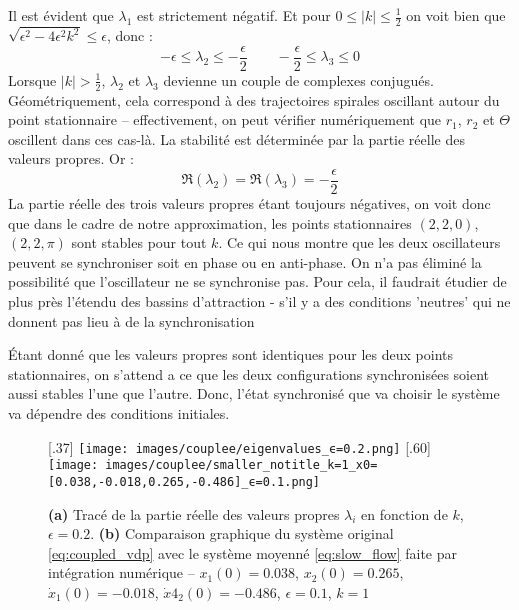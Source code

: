 %
Il est évident que $\lambda_1$ est strictement négatif. %
Et pour $0 \leq |k| \leq \frac{1}{2} $ on voit bien que $\sqrt{\epsilon^2 - 4\epsilon^2k^2} \leq \epsilon$, donc :
\[ -\epsilon \leq \lambda_2 \leq -\frac{\epsilon}{2} \qquad -\frac{\epsilon}{2} \leq \lambda_3 \leq 0\]
%
Lorsque $|k| > \frac{1}{2}$, $\lambda_2$ et $\lambda_3$ devienne un couple de complexes conjugués. Géométriquement, cela correspond à des trajectoires spirales oscillant autour du point stationnaire – effectivement, on peut vérifier numériquement que $r_1$, $r_2$ et $\Theta$ oscillent dans ces cas-là. La stabilité est déterminée par la partie réelle des valeurs propres. Or :
\[ \Re(\lambda_2) = \Re(\lambda_3) = -\frac{\epsilon}{2} \]
%
La partie réelle des trois valeurs propres étant toujours négatives, 
on voit donc que dans le cadre de notre approximation, les points stationnaires $(2, 2, 0)$, $(2, 2, \pi)$ sont stables pour tout $k$. 
Ce qui nous montre que les deux oscillateurs peuvent se synchroniser soit en phase ou en anti-phase. 
On n'a pas éliminé la possibilité que l'oscillateur ne se synchronise pas. 
Pour cela, il faudrait étudier de plus près l'étendu des bassins d'attraction - s'il y a des conditions 'neutres' 
qui ne donnent pas lieu à de la synchronisation

Étant donné que les valeurs propres sont identiques pour les deux points stationnaires, 
on s'attend a ce que les deux configurations synchronisées soient aussi stables l'une que l'autre. 
Donc, l'état synchronisé que va choisir le système va dépendre des conditions initiales.

\begin{figure}
    \centering
    \subcaptionbox{}[.37\linewidth]{%
        \texttt{[image: images/couplee/eigenvalues\_ϵ=0.2.png]}%
        \label{fig:eigenvals}
    }
    \hfill
    \subcaptionbox{}[.60\linewidth]{%
        \texttt{[image: images/couplee/smaller\_notitle\_k=1\_x0=[0.038,-0.018,0.265,-0.486]\_ϵ=0.1.png]}%
        \label{fig:comparaison}
    }
    \caption{\textbf{(a)} Tracé de la partie réelle des valeurs propres $\lambda_i$ en fonction de $k$, $\epsilon=0.2$. 
        \textbf{(b)} Comparaison graphique du système original \eqref{eq:coupled_vdp} avec le système moyenné \eqref{eq:slow_flow} faite par intégration numérique – $x_1(0)=0.038$, $x_2(0)=0.265$, $\dot{x}_1(0)=-0.018$, $\dot{x}4_2(0)=-0.486$, $\epsilon=0.1$, $k=1$}
    
\end{figure}
%